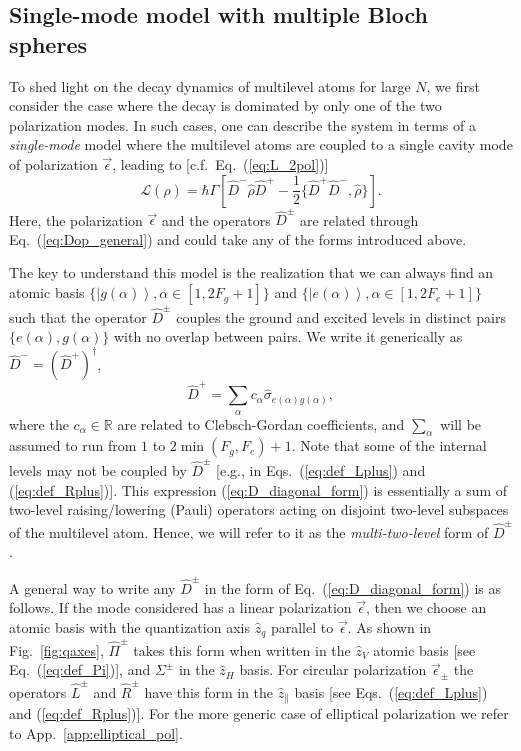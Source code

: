 \documentclass[aps,prx,superscriptaddress,twocolumn,notitlepage,nofootinbib,longbibliography]{revtex4-2}
\newcommand{\ket}[1]{\left|#1\right>}
\newcommand{\quv}{\hat{z}}
\begin{document}

\subsection{Single-mode model with multiple Bloch spheres\label{ssec:multiple_bloch}}

To shed light on the decay dynamics of multilevel atoms for large $N$, we first consider the case where the decay is dominated by only one of the two polarization modes.
In such cases, one can describe the system in terms of a \emph{single-mode} model where the multilevel atoms are coupled to a single cavity mode of polarization $\vec{\epsilon}$, leading to [c.f.~Eq.~(\ref{eq:L_2pol})]
\begin{equation}
	\mathcal{L}(\hat{\rho}) = \hbar\Gamma \left[ \hat{D}^- \hat{\rho} \hat{D}^+ - \frac{1}{2} \{ \hat{D}^+\hat{D}^-, \hat{\rho} \} \right] .
\label{eq:lindblad_multi_1pol}
\end{equation}
Here, the polarization $\vec{\epsilon}$ and the operators $\hat{D}^\pm$ are related through Eq.~(\ref{eq:Dop_general}) and could take any of the forms introduced above.

The key to understand this model is the realization that we can always find an atomic basis $\{\ket{g(\alpha)}, \alpha\in[1,2F_g+1]\}$ and $\{\ket{e(\alpha)}, \alpha\in[1,2F_e+1]\}$ such that the operator $\hat{D}^\pm$ couples the ground and excited levels in distinct pairs $\{e(\alpha),g(\alpha)\}$ with no overlap between pairs.
We write it generically as $\hat{D}^-=(\hat{D}^+)^\dagger$,
\begin{equation}
	\hat{D}^+ = \sum_\alpha c_\alpha \hat{\sigma}_{e(\alpha)g(\alpha)},
\label{eq:D_diagonal_form}
\end{equation}
where the $c_\alpha\in\mathbb{R}$ are related to Clebsch-Gordan coefficients, and $\sum_\alpha$ will be assumed to run from $1$ to $2\min(F_g,F_e)+1$.
Note that some of the internal levels may not be coupled by $\hat{D}^\pm$ [e.g., in Eqs.~(\ref{eq:def_Lplus}) and (\ref{eq:def_Rplus})].
This expression (\ref{eq:D_diagonal_form}) is essentially a sum of two-level raising/lowering (Pauli) operators acting on disjoint two-level subspaces of the multilevel atom.
Hence, we will refer to it as the \emph{multi-two-level} form of $\hat{D}^\pm$.

A general way to write any $\hat{D}^\pm$ in the form of Eq.~(\ref{eq:D_diagonal_form}) is as follows. If the mode considered has a linear polarization $\vec{\epsilon}$, then we choose an atomic basis with the quantization axis $\quv_q$ parallel to $\vec{\epsilon}$. As shown in Fig.~\ref{fig:qaxes}, $\hat{\Pi}^\pm$ takes this form when written in the $\quv_V$ atomic basis [see Eq.~(\ref{eq:def_Pi})], and $\Sigma^\pm$ in the $\quv_H$ basis. For circular polarization $\vec{\epsilon}_\pm$ the operators $\hat{L}^\pm$ and $\hat{R}^\pm$ have this form in the $\quv_\parallel$ basis [see Eqs.~(\ref{eq:def_Lplus}) and (\ref{eq:def_Rplus})]. For the more generic case of elliptical polarization we refer to App.~\ref{app:elliptical_pol}.
\end{document}
